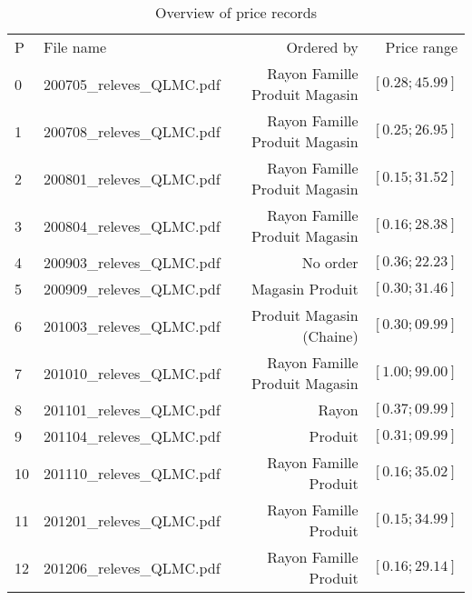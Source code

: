 \documentclass[11pt]{article}
\begin{document}
\begin{table}[H]
\renewcommand{\arraystretch}{0.7}%
\caption{Overview of price records}
\small

\begin{tabular}{llrr}
\toprule
\toprule
P  & File name                 & Ordered by                    & Price range    \\
0  & 200705\_releves\_QLMC.pdf & Rayon Famille Produit Magasin & $[0.28;45.99]$ \\
1  & 200708\_releves\_QLMC.pdf & Rayon Famille Produit Magasin & $[0.25;26.95]$ \\
2  & 200801\_releves\_QLMC.pdf & Rayon Famille Produit Magasin & $[0.15;31.52]$ \\
3  & 200804\_releves\_QLMC.pdf & Rayon Famille Produit Magasin & $[0.16;28.38]$ \\
4  & 200903\_releves\_QLMC.pdf & No order                      & $[0.36;22.23]$ \\
5  & 200909\_releves\_QLMC.pdf & Magasin Produit               & $[0.30;31.46]$ \\
6  & 201003\_releves\_QLMC.pdf & Produit Magasin (Chaine)      & $[0.30;09.99]$ \\
7  & 201010\_releves\_QLMC.pdf & Rayon Famille Produit Magasin & $[1.00;99.00]$ \\
8  & 201101\_releves\_QLMC.pdf & Rayon                         & $[0.37;09.99]$ \\
9  & 201104\_releves\_QLMC.pdf & Produit                       & $[0.31;09.99]$ \\
10 & 201110\_releves\_QLMC.pdf & Rayon Famille Produit         & $[0.16;35.02]$ \\
11 & 201201\_releves\_QLMC.pdf & Rayon Famille Produit         & $[0.15;34.99]$ \\
12 & 201206\_releves\_QLMC.pdf & Rayon Famille Produit         & $[0.16;29.14]$ \\
\bottomrule
\end{tabular}
\end{table}
\end{document}
